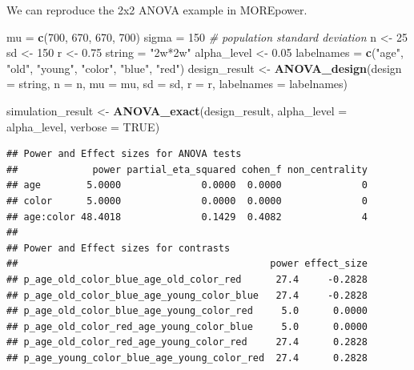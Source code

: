 \documentclass[]{book}
\newenvironment{Shaded}{\begin{snugshade}}{\end{snugshade}}
\newcommand{\CommentTok}[1]{\textcolor[rgb]{0.56,0.35,0.01}{\textit{#1}}}
\newcommand{\DataTypeTok}[1]{\textcolor[rgb]{0.13,0.29,0.53}{#1}}
\newcommand{\DecValTok}[1]{\textcolor[rgb]{0.00,0.00,0.81}{#1}}
\newcommand{\FloatTok}[1]{\textcolor[rgb]{0.00,0.00,0.81}{#1}}
\newcommand{\KeywordTok}[1]{\textcolor[rgb]{0.13,0.29,0.53}{\textbf{#1}}}
\newcommand{\NormalTok}[1]{#1}
\newcommand{\OtherTok}[1]{\textcolor[rgb]{0.56,0.35,0.01}{#1}}
\newcommand{\StringTok}[1]{\textcolor[rgb]{0.31,0.60,0.02}{#1}}
\begin{document}
We can reproduce the 2x2 ANOVA example in MOREpower.

\begin{Shaded}
\begin{Highlighting}[]
\NormalTok{mu =}\StringTok{ }\KeywordTok{c}\NormalTok{(}\DecValTok{700}\NormalTok{, }\DecValTok{670}\NormalTok{, }\DecValTok{670}\NormalTok{, }\DecValTok{700}\NormalTok{) }
\NormalTok{sigma =}\StringTok{ }\DecValTok{150}  \CommentTok{# population standard deviation}
\NormalTok{n <-}\StringTok{ }\DecValTok{25}
\NormalTok{sd <-}\StringTok{ }\DecValTok{150}
\NormalTok{r <-}\StringTok{ }\FloatTok{0.75}
\NormalTok{string =}\StringTok{ "2w*2w"}
\NormalTok{alpha_level <-}\StringTok{ }\FloatTok{0.05}
\NormalTok{labelnames =}\StringTok{ }\KeywordTok{c}\NormalTok{(}\StringTok{"age"}\NormalTok{, }\StringTok{"old"}\NormalTok{, }\StringTok{"young"}\NormalTok{, }\StringTok{"color"}\NormalTok{, }\StringTok{"blue"}\NormalTok{, }\StringTok{"red"}\NormalTok{)}
\NormalTok{design_result <-}\StringTok{ }\KeywordTok{ANOVA_design}\NormalTok{(}\DataTypeTok{design =}\NormalTok{ string,}
                              \DataTypeTok{n =}\NormalTok{ n, }
                              \DataTypeTok{mu =}\NormalTok{ mu, }
                              \DataTypeTok{sd =}\NormalTok{ sd, }
                              \DataTypeTok{r =}\NormalTok{ r, }
                              \DataTypeTok{labelnames =}\NormalTok{ labelnames)}

\NormalTok{simulation_result <-}\StringTok{ }\KeywordTok{ANOVA_exact}\NormalTok{(design_result, }
                                 \DataTypeTok{alpha_level =}\NormalTok{ alpha_level, }
                                 \DataTypeTok{verbose =} \OtherTok{TRUE}\NormalTok{)}
\end{Highlighting}
\end{Shaded}

\begin{verbatim}
## Power and Effect sizes for ANOVA tests
##             power partial_eta_squared cohen_f non_centrality
## age        5.0000              0.0000  0.0000              0
## color      5.0000              0.0000  0.0000              0
## age:color 48.4018              0.1429  0.4082              4
## 
## Power and Effect sizes for contrasts
##                                            power effect_size
## p_age_old_color_blue_age_old_color_red      27.4     -0.2828
## p_age_old_color_blue_age_young_color_blue   27.4     -0.2828
## p_age_old_color_blue_age_young_color_red     5.0      0.0000
## p_age_old_color_red_age_young_color_blue     5.0      0.0000
## p_age_old_color_red_age_young_color_red     27.4      0.2828
## p_age_young_color_blue_age_young_color_red  27.4      0.2828
\end{verbatim}
\end{document}

